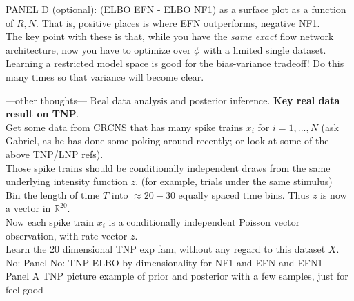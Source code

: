 \documentclass{article}
\begin{document}
PANEL D (optional): (ELBO EFN - ELBO NF1) as a surface plot as a function of $R,N$.  That is, positive places is where EFN outperforms, negative NF1. \\  
The key point with these is that, while you have the \emph{same exact} flow network architecture, now you have to optimize over $\phi$ with a limited single dataset.  Learning a restricted model space is good for the bias-variance tradeoff!  Do this many times so that variance will become clear.  


---other thoughts---
Real data analysis and posterior inference.  {\bf Key real data result on TNP}.  \\
Get some data from CRCNS that has many spike trains $x_i$ for $i=1,...,N$ (ask Gabriel, as he has done some poking around recently; or look at some of the above TNP/LNP refs). \\
Those spike trains should be conditionally independent draws from the same underlying intensity function $z$.  (for example, trials under the same stimulus)\\
Bin the length of time $T$ into $\approx 20-30$ equally spaced time bins.  Thus $z$ is now a vector in $\mathbb{R}^20$. \\
Now each spike train $x_i$ is a conditionally independent Poisson vector observation, with rate vector $z$.\\
Learn the 20 dimensional TNP exp fam, without any regard to this dataset $X$. \\
No: Panel No: TNP ELBO by dimensionality for NF1 and EFN and EFN1 \\
Panel A TNP picture example of prior and posterior with a few samples, just for feel good  \\
\end{document}
